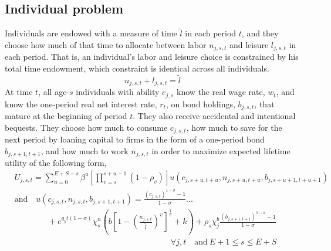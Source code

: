 \documentclass[letterpaper,12pt]{article}
\theoremstyle{definition}
\begin{document}
\begin{spacing}{1.5}
  \subsection{Individual problem}\label{SecIndProb}

    Individuals are endowed with a measure of time $\tilde{l}$ in each period $t$, and they choose how much of that time to allocate between labor $n_{j,s,t}$ and leisure $l_{j,s,t}$ in each period. That is, an individual's labor and leisure choice is constrained by his total time endowment, which constraint is identical across all individuals.
    \begin{equation}\label{EqLabConstr}
      n_{j,s,t} + l_{j,s,t} = \tilde{l}
    \end{equation}
    At time $t$, all age-$s$ individuals with ability $e_{j,s}$ know the real wage rate, $w_t$, and know the one-period real net interest rate, $r_t$, on bond holdings, $b_{j,s,t}$, that mature at the beginning of period $t$. They also receive accidental and intentional bequests. They choose how much to consume $c_{j,s,t}$, how much to save for the next period by loaning capital to firms in the form of a one-period bond $b_{j,s+1,t+1}$, and how much to work $n_{j,s,t}$ in order to maximize expected lifetime utility of the following form,
    \begin{equation}\label{EqUtilMax}
      \begin{split}
        &U_{j,s,t} = \sum_{u=0}^{E+S-s}\beta^u\left[\prod_{v=s}^{s+u-1}(1-\rho_v)\right] u\left(c_{j,s+u,t+u},n_{j,s+u,t+u},b_{j,s+u+1,t+u+1}\right) \\
        &\text{and} \quad u\left(c_{j,s,t},n_{j,s,t},b_{j,s+1,t+1}\right) = \frac{\left(c_{j,s,t}\right)^{1-\sigma} - 1}{1-\sigma} ... \\
        &\qquad\qquad + e^{g_y t(1-\sigma)}\chi^n_s\left(b\left[1 - \left(\frac{n_{j,s,t}}{\tilde{l}}\right)^\upsilon\right]^\frac{1}{\upsilon} + k\right) + \rho_s\chi^b_j\frac{\left(b_{j,s+1,t+1}\right)^{1-\sigma} - 1}{1-\sigma} \\
        &\quad\quad\quad\quad\quad\quad\quad\quad\quad\quad\quad\quad\quad\quad\quad\quad\quad\quad\quad\forall j,t\quad\text{and}\:E+1\leq s\leq E+S
      \end{split}
    \end{equation}

\end{spacing}
\end{document}
